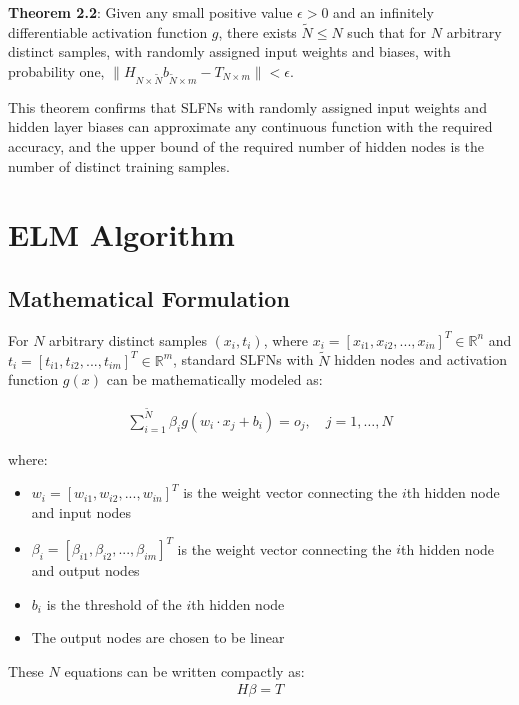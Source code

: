 \documentclass[11pt]{article}
\begin{document}
\textbf{Theorem 2.2}: Given any small positive value $\epsilon > 0$ and an infinitely differentiable activation function $g$, there exists $\tilde{N} \leq N$ such that for $N$ arbitrary distinct samples, with randomly assigned input weights and biases, with probability one, $\|H_{N \times \tilde{N}}b_{\tilde{N} \times m} - T_{N \times m}\| < \epsilon$.

This theorem confirms that SLFNs with randomly assigned input weights and hidden layer biases can approximate any continuous function with the required accuracy, and the upper bound of the required number of hidden nodes is the number of distinct training samples.

\section{ELM Algorithm}

\subsection{Mathematical Formulation}

For $N$ arbitrary distinct samples $(x_i, t_i)$, where $x_i = [x_{i1}, x_{i2}, ..., x_{in}]^T \in \mathbb{R}^n$ and $t_i = [t_{i1}, t_{i2}, ..., t_{im}]^T \in \mathbb{R}^m$, standard SLFNs with $\tilde{N}$ hidden nodes and activation function $g(x)$ can be mathematically modeled as:

\begin{align}
\sum_{i=1}^{\tilde{N}} \beta_i g(w_i \cdot x_j + b_i) = o_j, \quad j = 1, \ldots, N
\end{align}

where:
\begin{itemize}
    \item $w_i = [w_{i1}, w_{i2}, ..., w_{in}]^T$ is the weight vector connecting the $i$th hidden node and input nodes
    \item $\beta_i = [\beta_{i1}, \beta_{i2}, ..., \beta_{im}]^T$ is the weight vector connecting the $i$th hidden node and output nodes
    \item $b_i$ is the threshold of the $i$th hidden node
    \item The output nodes are chosen to be linear
\end{itemize}

These $N$ equations can be written compactly as:
\begin{align}
H\beta = T
\end{align}
\end{document}
